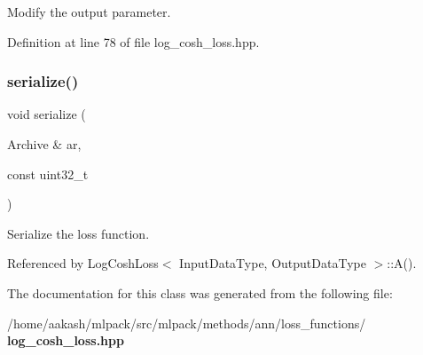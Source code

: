Modify the output parameter. 



Definition at line 78 of file log\+\_\+cosh\+\_\+loss.\+hpp.

\mbox{\label{classmlpack_1_1ann_1_1LogCoshLoss_a65cba07328997659bec80b9879b15a51}} 
\subsubsection{serialize()}
{\footnotesize\ttfamily void serialize (\begin{DoxyParamCaption}\item[{Archive \&}]{ar,  }\item[{const uint32\+\_\+t}]{ }\end{DoxyParamCaption})}



Serialize the loss function. 



Referenced by Log\+Cosh\+Loss$<$ Input\+Data\+Type, Output\+Data\+Type $>$\+::\+A().



The documentation for this class was generated from the following file\+:\begin{DoxyCompactItemize}
\item 
/home/aakash/mlpack/src/mlpack/methods/ann/loss\+\_\+functions/\textbf{ log\+\_\+cosh\+\_\+loss.\+hpp}\end{DoxyCompactItemize}

